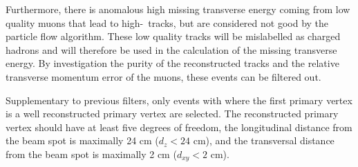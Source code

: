 Furthermore, there is anomalous high missing transverse energy coming from low quality muons that lead to high-\pt\ tracks, but are considered not good by the particle flow algorithm. These low quality tracks will be  mislabelled as charged hadrons and will therefore be used in the calculation of the missing transverse energy. By investigation the purity of the reconstructed tracks and the relative transverse momentum error of the muons, these events can be filtered out. 




Supplementary to previous filters, only events with where the first primary vertex is a well reconstructed primary vertex are selected. The reconstructed primary vertex should have at least five degrees of freedom, the longitudinal distance from the beam spot is maximally 24 cm ($d_z < 24$ cm), and the transversal distance from the beam spot is maximally 2 cm ($d_{xy}<2$ cm). 
